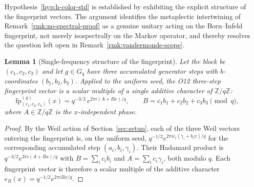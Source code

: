 \documentclass[11pt,a4paper]{article}
\newtheorem{lemma}[theorem]{Lemma}
\theoremstyle{definition}
\theoremstyle{remark}
\newcommand{\Gq}{G_q}
\newcommand{\Z}{\mathbb{Z}}
\begin{document}
      Hypothesis~\ref{hyp:h-color-std} is established by exhibiting the explicit structure of the
      fingerprint vectors.
      The argument identifies the metaplectic intertwining of Remark~\ref{rmk:no-spectral-proof}
      as a genuine unitary acting on the Born--Infeld fingerprint, not merely isospectrally on the
      Markov operator, and thereby resolves the question left open in
      Remark~\ref{rmk:vandermonde-scope}.

      \begin{lemma}[Single-frequency structure of the fingerprint]
        \label{lem:single-frequency}
        Let the block be $(c_1, c_2, c_3)$ and let $g \in \Gq$ have three accumulated generator
        steps with $b$-coordinates $(b_1, b_2, b_3)$.
        Applied to the uniform seed, the O12 three-step fingerprint vector is a scalar multiple of
        a single additive character of $\Z/q\Z$:
        \begin{equation}
          \label{eq:single-frequency}
          \mathrm{fp}^{(g)}_{(c_1,c_2,c_3)}(x)
          = q^{-3/2}\, e^{2\pi i (A + B x)/q},
          \qquad B = c_1 b_1 + c_2 b_2 + c_3 b_3 \pmod q,
        \end{equation}
        where $A \in \Z/q\Z$ is the $x$-independent phase.
      \end{lemma}
      \begin{proof}
        By the Weil action of Section~\ref{sec:setup}, each of the three Weil vectors entering the
        fingerprint is, on the uniform seed, $q^{-1/2} e^{2\pi i c_i(\gamma_i + b_i x)/q}$ for the
        corresponding accumulated step $(a_i, b_i, \gamma_i)$.
        Their Hadamard product is $q^{-3/2} e^{2\pi i (A + B x)/q}$ with $B = \sum_i c_i b_i$ and
        $A = \sum_i c_i \gamma_i$, both modulo $q$.
        Each fingerprint vector is therefore a scalar multiple of the additive character
        $e_B(x) = q^{-1/2} e^{2\pi i B x/q}$.
      \end{proof}
\end{document}
